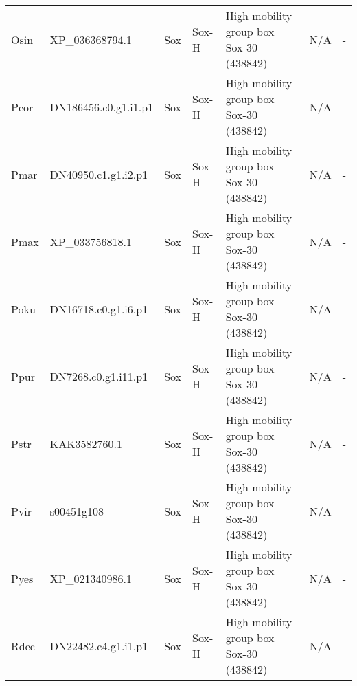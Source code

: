 \documentclass[../main.tex]{subfiles}
\begin{document}
\begin{landscape}
\begin{longtable}{lllllll}
		Osin           & XP\_036368794.1       & Sox            & Sox-H               & High mobility group box Sox-30 (438842)     & N/A                                                                    & -                    \\
		Pcor           & DN186456.c0.g1.i1.p1  & Sox            & Sox-H               & High mobility group box Sox-30 (438842)     & N/A                                                                    & -                    \\
		Pmar           & DN40950.c1.g1.i2.p1   & Sox            & Sox-H               & High mobility group box Sox-30 (438842)     & N/A                                                                    & -                    \\
		Pmax           & XP\_033756818.1       & Sox            & Sox-H               & High mobility group box Sox-30 (438842)     & N/A                                                                    & -                    \\
		Poku           & DN16718.c0.g1.i6.p1   & Sox            & Sox-H               & High mobility group box Sox-30 (438842)     & N/A                                                                    & -                    \\
		Ppur           & DN7268.c0.g1.i11.p1   & Sox            & Sox-H               & High mobility group box Sox-30 (438842)     & N/A                                                                    & -                    \\
		Pstr           & KAK3582760.1          & Sox            & Sox-H               & High mobility group box Sox-30 (438842)     & N/A                                                                    & -                    \\
		Pvir           & s00451g108            & Sox            & Sox-H               & High mobility group box Sox-30 (438842)     & N/A                                                                    & -                    \\
		Pyes           & XP\_021340986.1       & Sox            & Sox-H               & High mobility group box Sox-30 (438842)     & N/A                                                                    & -                    \\
		Rdec           & DN22482.c4.g1.i1.p1   & Sox            & Sox-H               & High mobility group box Sox-30 (438842)     & N/A                                                                    & -                    \\

\end{longtable}
\end{landscape}
\end{document}
